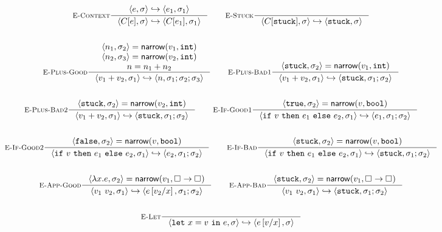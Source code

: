 \begin{figure*}
\begin{gather*}
\inference[\recontext]
  {\step{e}{\su}{e_1}{\su_1}}
  {\step{C[e]}{\su}{C[e_1]}{\su_1}}
\qquad
\inference[\restuck]
  {}
  {\step{C[\stuck]}{\su}{\stuck}{\su}}
\\ \\
\inference[\replusgood]
  {\pair{n_1}{\su_2} = \force{v_1}{\tint} \\
   \pair{n_2}{\su_3} = \force{v_2}{\tint} \\
   n = \eplus{n_1}{n_2}}
  {\step{\eplus{v_1}{v_2}}{\su_1}{n}{\su_1;\su_2;\su_3}}
\qquad
\inference[\replusbadone]
  {\pair{\stuck}{\su_2} = \force{v_1}{\tint}}
  {\step{\eplus{v_1}{v_2}}{\su_1}{\stuck}{\su_1;\su_2}}
\\ \\
\inference[\replusbadtwo]
  {\pair{\stuck}{\su_2} = \force{v_2}{\tint}}
  {\step{\eplus{v_1}{v_2}}{\su_1}{\stuck}{\su_1;\su_2}}
\qquad
\inference[\reifgoodone]
  {\pair{\etrue}{\su_2} = \force{v}{\tbool}}
  {\step{\eif{v}{e_1}{e_2}}{\su_1}{e_1}{\su_1;\su_2}}
\\ \\
\inference[\reifgoodtwo]
  {\pair{\efalse}{\su_2} = \force{v}{\tbool}}
  {\step{\eif{v}{e_1}{e_2}}{\su_1}{e_2}{\su_1;\su_2}}
\qquad
\inference[\reifbad]
  {\pair{\stuck}{\su_2} = \force{v}{\tbool}}
  {\step{\eif{v}{e_1}{e_2}}{\su_1}{\stuck}{\su_1;\su_2}}
\\ \\
\inference[\reappgood]
  {\pair{\efun{x}{e}}{\su_2} = \force{v_1}{\tfun{\thole{}}{\thole{}}}}
  {\step{\eapp{v_1}{v_2}}{\su_1}{e\sub{x}{v_2}}{\su_1;\su_2}}
\qquad
\inference[\reappbad]
  {\pair{\stuck}{\su_2} = \force{v_1}{\tfun{\thole{}}{\thole{}}}}
  {\step{\eapp{v_1}{v_2}}{\su_1}{\stuck}{\su_1;\su_2}}
\\ \\
\inference[\relet]
  {}
  {\step{\elet{x}{v}{e}}{\su}{e\sub{x}{v}}{\su}}
\end{gather*}
\\ %

\end{figure*}

